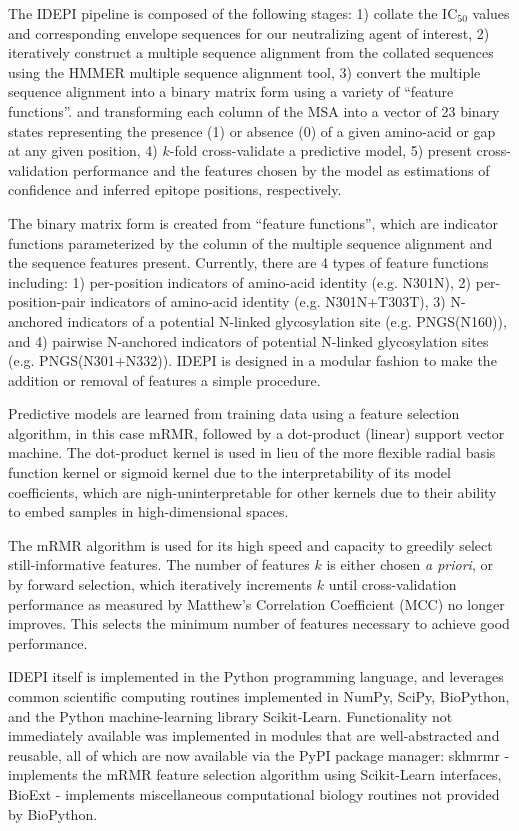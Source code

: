 \documentclass[10pt]{article}
\newcommand{\hmic}{{IC}$_{50}$}
\newcommand{\idepi}{{IDEPI}}
\newcommand{\mrmr}{{mRMR}}
\begin{document}
The \idepi{} pipeline is composed of the following stages:
1) collate the \hmic{} values and corresponding envelope sequences for our neutralizing agent of interest,
2) iteratively construct a multiple sequence alignment from the collated sequences using the {HMMER} multiple sequence alignment tool,
3) convert the multiple sequence alignment into a binary matrix form using a variety of ``feature functions''.%
and transforming each column of the MSA into a vector of 23 binary states representing the presence (1) or absence (0) of a given amino-acid or gap at any given position,
4) $k$-fold cross-validate a predictive model,
5) present cross-validation performance and the features chosen by the model as estimations of confidence and inferred epitope positions, respectively.

The binary matrix form is created from ``feature functions'',
which are indicator functions parameterized by the column of the multiple sequence alignment
and the sequence features present. Currently, there are 4 types of feature functions including:
1) per-position indicators of amino-acid identity (e.g. N301N),
2) per-position-pair indicators of amino-acid identity (e.g. N301N+T303T),
3) N-anchored indicators of a potential N-linked glycosylation site (e.g. PNGS(N160)),
and 4) pairwise N-anchored indicators of potential N-linked glycosylation sites (e.g. PNGS(N301+N332)).
\idepi{} is designed in a modular fashion to make the addition or removal of features a simple procedure.

Predictive models are learned from training data using a feature selection algorithm,
in this case \mrmr{}, followed by a dot-product (linear) support vector machine.
The dot-product kernel is used in lieu of the more flexible radial basis function kernel or sigmoid kernel
due to the interpretability of its model coefficients,
which are nigh-uninterpretable for other kernels due to their ability to embed samples in high-dimensional spaces.

The \mrmr{} algorithm is used for its high speed and capacity to greedily select still-informative features.
The number of features $k$ is either chosen \emph{a priori},
or by forward selection,
which iteratively increments $k$ until cross-validation performance as measured by Matthew's Correlation Coefficient (MCC) no longer improves.
This selects the minimum number of features necessary to achieve good performance.

\idepi{} itself is implemented in the Python programming language,
and leverages common scientific computing routines implemented in NumPy, SciPy, BioPython,
and the Python machine-learning library Scikit-Learn.
Functionality not immediately available was implemented in modules that are well-abstracted and reusable,
all of which are now available via the PyPI package manager:
sklmrmr - implements the \mrmr{} feature selection algorithm using Scikit-Learn interfaces,
BioExt - implements miscellaneous computational biology routines not provided by BioPython.
\end{document}
